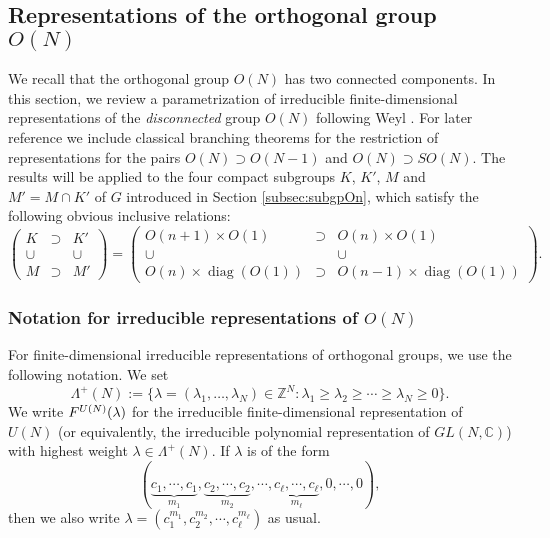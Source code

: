 \subsection{Representations of the orthogonal group $O(N)$}
\label{subsec:repON}
We recall that the orthogonal group $O(N)$ has two connected components.  
In this section,
 we review a parametrization 
 of irreducible finite-dimensional representations
 of the {\it{disconnected}} group $O(N)$
 following Weyl 
 \cite[Chap.~V, Sect.~7]{Weyl97}.  
For later reference we include classical branching theorems 
 for the restriction 
 of representations
 for the pairs $O(N) \supset O(N-1)$
 and $O(N) \supset SO(N)$.  
The results will be applied to the four compact subgroups $K$, 
$K'$, 
$M$ and 
$M'=M \cap K'$ of $G$
 introduced in Section \ref{subsec:subgpOn}, 
 which satisfy the following obvious inclusive relations:
\[
\begin{pmatrix}
 K & \supset & K'
\\
\cup & & \cup
\\
 M & \supset & M'
\end{pmatrix}
=
\begin{pmatrix}
 O(n+1) \times O(1) & \supset & O(n) \times O(1)
\\
\cup & & \cup
\\
 O(n) \times {\operatorname{diag}}(O(1)) & \supset & O(n-1) \times {\operatorname{diag}}(O(1))
\end{pmatrix}.  
\]




\subsubsection{Notation for irreducible representations of $O(N)$}
\label{subsec:ONWeyl}
For finite-dimensional irreducible representations
 of orthogonal groups, 
 we use the following notation. 
We set
\begin{equation}
\label{eqn:Lambda}
\Lambda^+(N):=\{ \lambda = (\lambda_1, \ldots, \lambda_N) \in {\mathbb{Z}}^N:
\lambda_1 \geq \lambda_2 \geq \cdots \geq \lambda_N \geq 0\}.
\end{equation}
We write 
 $F^{{U(N)}}({\lambda})$
 for the irreducible finite-dimensional representation 
of $U(N)$ (or equivalently, the irreducible polynomial representation
 of $GL(N,{\mathbb{C}})$)
with highest weight $\lambda \in \Lambda^+(N)$. 
If $\lambda$ is of the form 
\begin{equation*}
(\underbrace{c_1,\cdots,c_1}_{m_1},
\underbrace{c_2,\cdots,c_2}_{m_2},\cdots,\underbrace{c_\ell,\cdots,c_\ell}_{m_\ell},0,\cdots,0),
\end{equation*}
then we also write $\lambda=\left(c_1^{m_1},c_2^{m_2},\cdots,c_\ell^{m_\ell}\right)$ as usual. 



